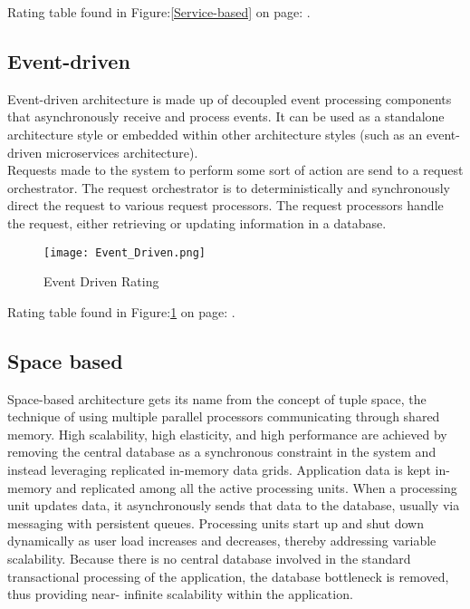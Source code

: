 \documentclass[11pt]{scrartcl} %
\begin{document}
Rating table found in Figure:\ref{Service-based} on page: \pageref{Service-based}. 

\subsection{Event-driven}

Event-driven architecture is made up of decoupled event processing components that asynchronously 
receive and process events. It can be used as a standalone architecture 
style or embedded within other architecture styles (such as an event-driven microservices architecture).\\

Requests made to the system to perform some sort of action are send to a request orchestrator.
The request orchestrator is to deterministically and synchronously direct the request to various 
request processors. The request processors handle the request, either retrieving or updating 
information in a database.\\

\begin{figure}[h] %
	\centering
	\texttt{[image: Event\_Driven.png]} %
	\caption{Event Driven Rating}
  \label{Event_Driven}
\end{figure}

Rating table found in Figure:\ref{Event_Driven} on page: \pageref{Event_Driven}. 

\subsection{Space based}

Space-based architecture gets its name from the concept of tuple space, 
the technique of using multiple parallel processors communicating through shared memory. 
High scalability, high elasticity, and high performance are achieved by removing the central 
database as a synchronous constraint in the system and instead leveraging replicated in-memory data grids. 
Application data is kept in- memory and replicated among all the active processing units. 
When a processing unit updates data, it asynchronously sends that data to the database, usually via 
messaging with persistent queues. Processing units start up and shut down dynamically as user load 
increases and decreases, thereby addressing variable scalability. Because there is no central database 
involved in the standard transactional processing of the application, 
the database bottleneck is removed, thus providing near- infinite scalability within the application.\\
\end{document}
